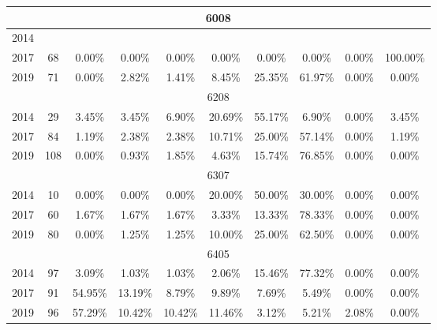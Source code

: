 \begin{table}[H]
\begin{tabular}{|l|c|ccc|ccc|cc|}
\hline
\hline
\multicolumn{10}{|c|}{6008}\\
\hline
2014 & & & & & & & & & \\
2017 & 68 & 0.00\% & 0.00\% & 0.00\% & 0.00\% & 0.00\% & 0.00\% & 0.00\% & 100.00\%\\
2019 & 71 & 0.00\% & 2.82\% & 1.41\% & 8.45\% & 25.35\% & 61.97\% & 0.00\% & 0.00\%\\
\hline
\hline
\multicolumn{10}{|c|}{6208}\\
\hline
2014 & 29 & 3.45\% & 3.45\% & 6.90\% & 20.69\% & 55.17\% & 6.90\% & 0.00\% & 3.45\%\\
2017 & 84 & 1.19\% & 2.38\% & 2.38\% & 10.71\% & 25.00\% & 57.14\% & 0.00\% & 1.19\%\\
2019 & 108 & 0.00\% & 0.93\% & 1.85\% & 4.63\% & 15.74\% & 76.85\% & 0.00\% & 0.00\%\\
\hline
\hline
\multicolumn{10}{|c|}{6307}\\
\hline
2014 & 10 & 0.00\% & 0.00\% & 0.00\% & 20.00\% & 50.00\% & 30.00\% & 0.00\% & 0.00\%\\
2017 & 60 & 1.67\% & 1.67\% & 1.67\% & 3.33\% & 13.33\% & 78.33\% & 0.00\% & 0.00\%\\
2019 & 80 & 0.00\% & 1.25\% & 1.25\% & 10.00\% & 25.00\% & 62.50\% & 0.00\% & 0.00\%\\
\hline
\hline
\multicolumn{10}{|c|}{6405}\\
\hline
2014 & 97 & 3.09\% & 1.03\% & 1.03\% & 2.06\% & 15.46\% & 77.32\% & 0.00\% & 0.00\%\\
2017 & 91 & 54.95\% & 13.19\% & 8.79\% & 9.89\% & 7.69\% & 5.49\% & 0.00\% & 0.00\%\\
2019 & 96 & 57.29\% & 10.42\% & 10.42\% & 11.46\% & 3.12\% & 5.21\% & 2.08\% & 0.00\%\\
\hline
\bottomrule
\end{tabular}
\end{table}
